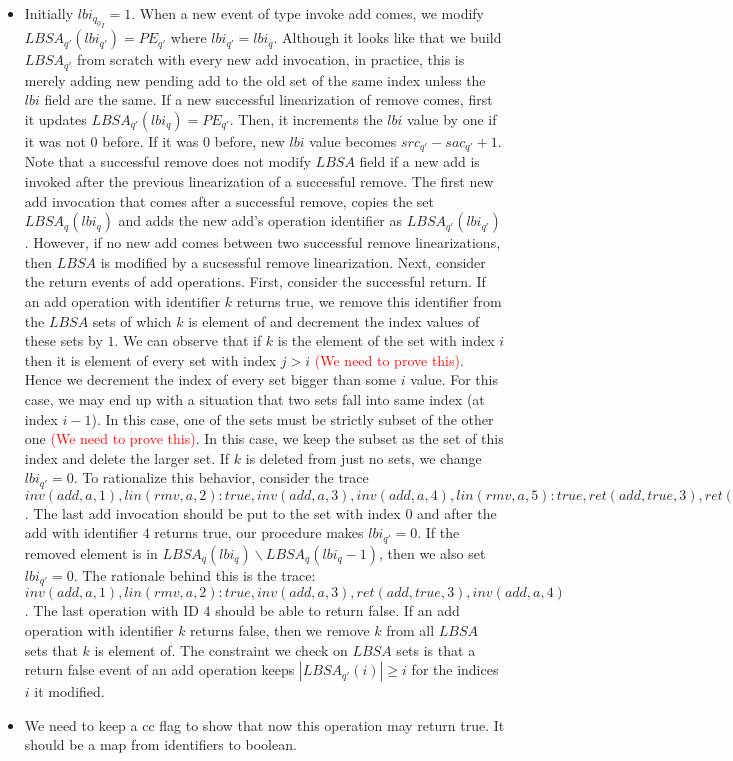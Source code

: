 \begin{itemize}
\begin{itemize}
\item[$LBSA$] Initially $lbi_{{q_0}_I} = 1$. When a new event of type invoke add comes, we modify $LBSA_{q'}(lbi_{q'}) = PE_{q'}$ where $lbi_{q'} = lbi_q$. Although it looks like that we build $LBSA_{q'}$ from scratch with every new add invocation, in practice, this is merely adding new pending add to the old set of the same index unless the $lbi$ field are the same. If a new successful linearization of remove comes, first it updates $LBSA_{q'}(lbi_q) = PE_{q'}$. Then, it increments the $lbi$ value by one if it was not $0$ before. If it was $0$ before, new $lbi$ value becomes $src_{q'} - sac_{q'}+1$. Note that a successful remove does not modify $LBSA$ field if a new add is invoked after the previous linearization of a successful remove. The first new add invocation that comes after a successful remove, copies the set $LBSA_{q}(lbi_q)$ and adds the new add's operation identifier as $LBSA_{q'}(lbi_{q'})$. However, if no new add comes between two successful remove linearizations, then $LBSA$ is modified by a sucsessful remove linearization. Next, consider the return events of add operations. First, consider the successful return. If an add operation with identifier $k$ returns true, we remove this identifier from the $LBSA$ sets of which $k$ is element of and decrement the index values of these sets by $1$. We can observe that if $k$ is the element of the set with index $i$ then it is element of every set with index $j>i$ \textcolor{red}{(We need to prove this)}. Hence we decrement the index of every set bigger than some $i$ value. For this case, we may end up with a situation that two sets fall into same index (at index $i-1$). In this case, one of the sets must be strictly subset of the other one \textcolor{red}{(We need to prove this)}. In this case, we keep the subset as the set of this index and delete the larger set. If $k$ is deleted from just no sets, we change $lbi_{q'} = 0$. To rationalize this behavior, consider the trace $inv(add,a,1), lin(rmv,a,2):true, inv(add,a,3), inv(add,a,4), lin(rmv,a,5):true, ret(add,true,3), ret(add,true,4), inv(add,a,6)$. The last add invocation should be put to the set with index $0$ and after the add with identifier $4$ returns true, our procedure makes $lbi_{q'} = 0$. If the removed element is in $LBSA_q(lbi_q) \backslash LBSA_q(lbi_q -1)$, then we also set $lbi_{q'} = 0$. The rationale behind this is the trace: $inv(add,a,1), lin(rmv,a,2):true, inv(add,a,3), ret(add,true,3), inv(add,a,4)$. The last operation with ID $4$ should be able to return false. If an add operation with identifier $k$ returns false, then we remove $k$ from all $LBSA$ sets that $k$ is element of. The constraint we check on $LBSA$ sets is that a return false event of an add operation keeps $|LBSA_{q'}(i)| \geq i$ for the indices $i$ it modified. 
\item [$CC$] We need to keep a cc flag to show that now this operation may return true. It should be a map from identifiers to boolean.
\end{itemize}
\end{itemize}